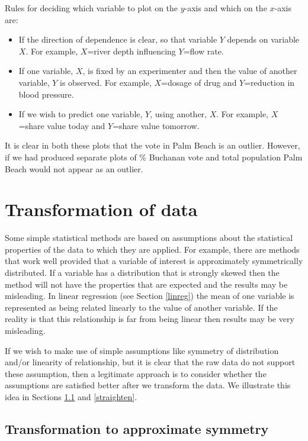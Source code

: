 \documentclass[
  british,
]{book}
\providecommand{\tightlist}{%
  \setlength{\itemsep}{0pt}\setlength{\parskip}{0pt}}
\begin{document}
Rules for deciding which variable to plot on the \(y\)-axis and which on the \(x\)-axis are:

\begin{itemize}
\tightlist
\item
  If the direction of dependence is clear, so that variable \(Y\) depends on variable \(X\). For example, \(X\)=river depth influencing \(Y\)=flow rate.
\item
  If one variable, \(X\), is fixed by an experimenter and then the value of another variable, \(Y\) is observed. For example, \(X\)=dosage of drug and \(Y\)=reduction in blood pressure.
\item
  If we wish to predict one variable, \(Y\), using another, \(X\). For example,
  \(X\)=share value today and \(Y\)=share value tomorrow.
\end{itemize}

It is clear in both these plots that the vote in Palm Beach is an outlier.
However, if we had produced separate plots of \% Buchanan vote and total
population Palm Beach would not appear as an outlier.

\hypertarget{transformation-of-data}{%
\section{Transformation of data}\label{transformation-of-data}}

Some simple statistical methods are based on assumptions about the statistical properties of the data to which they are applied. For example, there are methods that work well provided that a variable of interest is approximately symmetrically distributed. If a variable has a distribution that is strongly skewed then the method will not have the properties that are expected and the results may be misleading. In linear regression (see Section \ref{linreg}) the mean of one variable is represented as being related linearly to the value of another variable. If the reality is that this relationship is far from being linear then results may be very misleading.

If we wish to make use of simple assumptions like symmetry of distribution and/or linearity of relationship, but it is clear that the raw data do not support these assumption, then a legitimate approach is to consider whether the assumptions are satisfied better after we transform the data. We illustrate this idea in Sections \ref{transsymmetry} and \ref{straighten}.

\hypertarget{transsymmetry}{%
\subsection{Transformation to approximate symmetry}\label{transsymmetry}}
\end{document}
